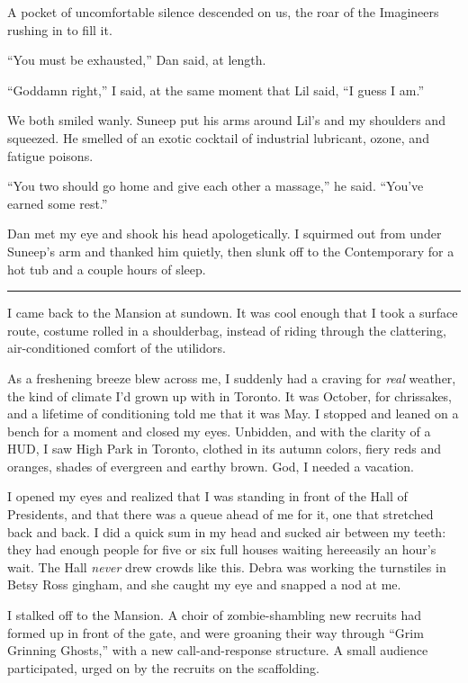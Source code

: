 A pocket of uncomfortable silence descended on us, the roar of the
Imagineers rushing in to fill it.

“You must be exhausted,” Dan said, at length.

“Goddamn right,” I said, at the same moment that Lil said, “I guess
I am.”

We both smiled wanly. Suneep put his arms around Lil's and my
shoulders and squeezed. He smelled of an exotic cocktail of
industrial lubricant, ozone, and fatigue poisons.

“You two should go home and give each other a massage,” he said.
“You've earned some rest.”

Dan met my eye and shook his head apologetically. I squirmed out
from under Suneep's arm and thanked him quietly, then slunk off to
the Contemporary for a hot tub and a couple hours of sleep.

\begin{center}\rule{1in}{0.4pt}\end{center}

I came back to the Mansion at sundown. It was cool enough that I
took a surface route, costume rolled in a shoulderbag, instead of
riding through the clattering, air-con\-di\-tioned comfort of the
utilidors.

As a freshening breeze blew across me, I suddenly had a craving for
\emph{real} weather, the kind of climate I'd grown up with in
Toronto. It was October, for chrissakes, and a lifetime of
conditioning told me that it was May. I stopped and leaned on a
bench for a moment and closed my eyes. Unbidden, and with the
clarity of a HUD, I saw High Park in Toronto, clothed in its autumn
colors, fiery reds and oranges, shades of evergreen and earthy
brown. God, I needed a vacation.

I opened my eyes and realized that I was standing in front of the
Hall of Presidents, and that there was a queue ahead of me for it,
one that stretched back and back. I did a quick sum in my head and
sucked air between my teeth: they had enough people for five or six
full houses waiting here{\dash}easily an hour's wait. The Hall
\emph{never} drew crowds like this. Debra was working the
turnstiles in Betsy Ross gingham, and she caught my eye and snapped
a nod at me.

I stalked off to the Mansion. A choir of zombie-shambling new
recruits had formed up in front of the gate, and were groaning
their way through “Grim Grinning Ghosts,” with a new
call-and-response structure. A small audience participated, urged
on by the recruits on the scaffolding.

